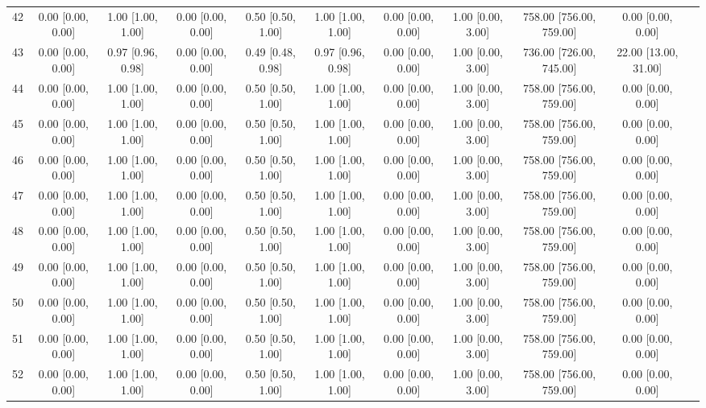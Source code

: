 \documentclass[8pt]{article}
\begin{document}
\begin{center}
\begin{footnotesize}
\begin{longtable}{|ccccccccccc|}
 42 &  0.00 [0.00, 0.00] &  1.00 [1.00, 1.00] &  0.00 [0.00, 0.00] &  0.50 [0.50, 1.00] &  1.00 [1.00, 1.00] &  0.00 [0.00, 0.00] &  1.00 [0.00, 3.00] &  758.00 [756.00, 759.00] &       0.00 [0.00, 0.00] \\
 43 &  0.00 [0.00, 0.00] &  0.97 [0.96, 0.98] &  0.00 [0.00, 0.00] &  0.49 [0.48, 0.98] &  0.97 [0.96, 0.98] &  0.00 [0.00, 0.00] &  1.00 [0.00, 3.00] &  736.00 [726.00, 745.00] &    22.00 [13.00, 31.00] \\
 44 &  0.00 [0.00, 0.00] &  1.00 [1.00, 1.00] &  0.00 [0.00, 0.00] &  0.50 [0.50, 1.00] &  1.00 [1.00, 1.00] &  0.00 [0.00, 0.00] &  1.00 [0.00, 3.00] &  758.00 [756.00, 759.00] &       0.00 [0.00, 0.00] \\
 45 &  0.00 [0.00, 0.00] &  1.00 [1.00, 1.00] &  0.00 [0.00, 0.00] &  0.50 [0.50, 1.00] &  1.00 [1.00, 1.00] &  0.00 [0.00, 0.00] &  1.00 [0.00, 3.00] &  758.00 [756.00, 759.00] &       0.00 [0.00, 0.00] \\
 46 &  0.00 [0.00, 0.00] &  1.00 [1.00, 1.00] &  0.00 [0.00, 0.00] &  0.50 [0.50, 1.00] &  1.00 [1.00, 1.00] &  0.00 [0.00, 0.00] &  1.00 [0.00, 3.00] &  758.00 [756.00, 759.00] &       0.00 [0.00, 0.00] \\
 47 &  0.00 [0.00, 0.00] &  1.00 [1.00, 1.00] &  0.00 [0.00, 0.00] &  0.50 [0.50, 1.00] &  1.00 [1.00, 1.00] &  0.00 [0.00, 0.00] &  1.00 [0.00, 3.00] &  758.00 [756.00, 759.00] &       0.00 [0.00, 0.00] \\
 48 &  0.00 [0.00, 0.00] &  1.00 [1.00, 1.00] &  0.00 [0.00, 0.00] &  0.50 [0.50, 1.00] &  1.00 [1.00, 1.00] &  0.00 [0.00, 0.00] &  1.00 [0.00, 3.00] &  758.00 [756.00, 759.00] &       0.00 [0.00, 0.00] \\
 49 &  0.00 [0.00, 0.00] &  1.00 [1.00, 1.00] &  0.00 [0.00, 0.00] &  0.50 [0.50, 1.00] &  1.00 [1.00, 1.00] &  0.00 [0.00, 0.00] &  1.00 [0.00, 3.00] &  758.00 [756.00, 759.00] &       0.00 [0.00, 0.00] \\
 50 &  0.00 [0.00, 0.00] &  1.00 [1.00, 1.00] &  0.00 [0.00, 0.00] &  0.50 [0.50, 1.00] &  1.00 [1.00, 1.00] &  0.00 [0.00, 0.00] &  1.00 [0.00, 3.00] &  758.00 [756.00, 759.00] &       0.00 [0.00, 0.00] \\
 51 &  0.00 [0.00, 0.00] &  1.00 [1.00, 1.00] &  0.00 [0.00, 0.00] &  0.50 [0.50, 1.00] &  1.00 [1.00, 1.00] &  0.00 [0.00, 0.00] &  1.00 [0.00, 3.00] &  758.00 [756.00, 759.00] &       0.00 [0.00, 0.00] \\
 52 &  0.00 [0.00, 0.00] &  1.00 [1.00, 1.00] &  0.00 [0.00, 0.00] &  0.50 [0.50, 1.00] &  1.00 [1.00, 1.00] &  0.00 [0.00, 0.00] &  1.00 [0.00, 3.00] &  758.00 [756.00, 759.00] &       0.00 [0.00, 0.00] \\

\end{longtable}
\end{footnotesize}
\end{center}
\end{document}
